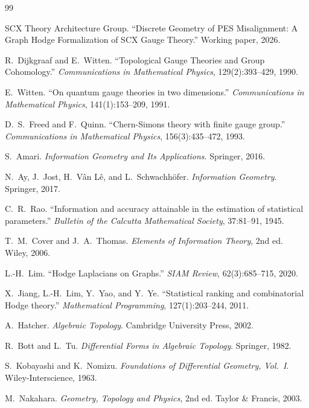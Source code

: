 \documentclass[12pt,a4paper]{article}
\theoremstyle{definition}
\theoremstyle{remark}
\theoremstyle{definition}
\begin{document}
\begin{thebibliography}{99}

SCX Theory Architecture Group.
``Discrete Geometry of PES Misalignment: A Graph Hodge Formalization of SCX Gauge Theory.''
Working paper, 2026.

R.~Dijkgraaf and E.~Witten.
``Topological Gauge Theories and Group Cohomology.''
\emph{Communications in Mathematical Physics}, 129(2):393--429, 1990.

E.~Witten.
``On quantum gauge theories in two dimensions.''
\emph{Communications in Mathematical Physics}, 141(1):153--209, 1991.

D.~S.~Freed and F.~Quinn.
``Chern-Simons theory with finite gauge group.''
\emph{Communications in Mathematical Physics}, 156(3):435--472, 1993.

S.~Amari.
\emph{Information Geometry and Its Applications}.
Springer, 2016.

N.~Ay, J.~Jost, H.~V\^an L\^e, and L.~Schwachh\"ofer.
\emph{Information Geometry}.
Springer, 2017.

C.~R.~Rao.
``Information and accuracy attainable in the estimation of statistical parameters.''
\emph{Bulletin of the Calcutta Mathematical Society}, 37:81--91, 1945.

T.~M.~Cover and J.~A.~Thomas.
\emph{Elements of Information Theory}, 2nd ed.
Wiley, 2006.

L.-H.~Lim.
``Hodge Laplacians on Graphs.''
\emph{SIAM Review}, 62(3):685--715, 2020.

X.~Jiang, L.-H.~Lim, Y.~Yao, and Y.~Ye.
``Statistical ranking and combinatorial Hodge theory.''
\emph{Mathematical Programming}, 127(1):203--244, 2011.

A.~Hatcher.
\emph{Algebraic Topology}.
Cambridge University Press, 2002.

R.~Bott and L.~Tu.
\emph{Differential Forms in Algebraic Topology}.
Springer, 1982.

S.~Kobayashi and K.~Nomizu.
\emph{Foundations of Differential Geometry, Vol.~I}.
Wiley-Interscience, 1963.

M.~Nakahara.
\emph{Geometry, Topology and Physics}, 2nd ed.
Taylor \& Francis, 2003.


\end{thebibliography}
\end{document}
